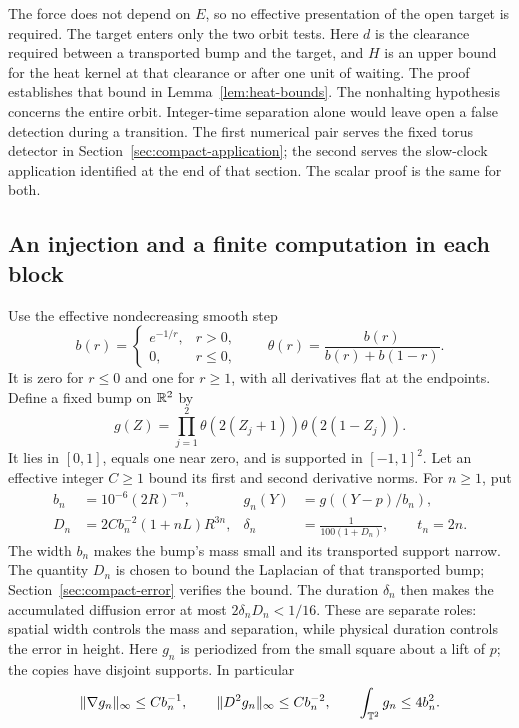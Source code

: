 The force does not depend on $E$, so no effective presentation of the
open target is required. The target enters only the two orbit tests.
Here $d$ is the clearance required between a transported bump and the
target, and $H$ is an upper bound for the heat kernel at that clearance
or after one unit of waiting. The proof establishes that bound in
Lemma~\ref{lem:heat-bounds}.
The nonhalting hypothesis concerns the entire orbit. Integer-time
separation alone would leave open a false detection during a transition.
The first numerical pair serves the fixed torus detector in
Section~\ref{sec:compact-application}; the second serves the
slow-clock application identified at the end of that section.
The scalar proof is the same for both.

\subsection{An injection and a finite computation in each block}
\label{sec:compact-blocks}

Use the effective nondecreasing smooth step
\[
 b(r)=\begin{cases}e^{-1/r},&r>0,\\0,&r\le0,\end{cases}
 \qquad \theta(r)=\frac{b(r)}{b(r)+b(1-r)}.
\]
It is zero for $r\le0$ and one for $r\ge1$, with all derivatives flat
at the endpoints. Define a fixed bump on $\mathbb R^2$ by
\[
 g(Z)=\prod_{j=1}^2\theta(2(Z_j+1))\theta(2(1-Z_j)).
\]
It lies in $[0,1]$, equals one near zero, and is supported in $[-1,1]^2$.
Let an effective integer $C\ge1$ bound its first and second derivative
norms. For $n\ge1$, put
\begin{equation}\label{eq:compact-scales}
 \begin{aligned}
 b_n&=10^{-6}(2R)^{-n},&g_n(Y)&=g((Y-p)/b_n),\\
 D_n&=2Cb_n^{-2}(1+nL)R^{3n},&
 \delta_n&=\frac1{100(1+D_n)},\qquad t_n=2n.
 \end{aligned}
\end{equation}
The width $b_n$ makes the bump's mass small and its transported support
narrow. The quantity $D_n$ is chosen to bound the Laplacian of that
transported bump; Section~\ref{sec:compact-error} verifies the bound.
The duration $\delta_n$ then makes the accumulated diffusion error
at most $2\delta_nD_n<1/16$. These are separate roles: spatial width
controls the mass and separation, while physical duration controls
the error in height.
Here $g_n$ is periodized from the small square about a lift of $p$;
the copies have disjoint supports. In particular
\begin{equation}\label{eq:bump-bounds}
 \|\nabla g_n\|_\infty\le Cb_n^{-1},\qquad
 \|D^2g_n\|_\infty\le Cb_n^{-2},\qquad
 \int_{\mathbb T^2}g_n\le4b_n^2.
\end{equation}

